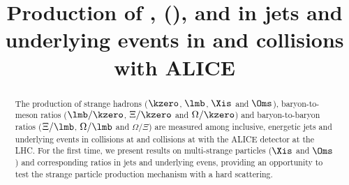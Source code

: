 \documentclass[ALICE,manyauthors]{cernphprep}
\begin{document}
\begin{titlepage}

\title{Production of \kzero, \lmb (\almb), \Xis and \Oms in jets and underlying events in \pp and \pPb collisions with ALICE}


\begin{abstract}
\label{sec:Abs}

The production of strange hadrons ($\kzero$, $\lmb$, $\Xis$ and $\Oms$), baryon-to-meson ratios ($\lmb/\kzero$, $\Xi/\kzero$ and $\Omega/\kzero$) and baryon-to-baryon ratios ($\Xi/\lmb$, $\Omega/\lmb$ and $\Omega/\Xi$) are measured among inclusive, energetic jets and underlying events in \pp collisions at \thirteen and \pPb collisions at \fivenn with the ALICE detector at the LHC.
For the first time, we present results on multi-strange particles ($\Xis$ and $\Oms$) and corresponding ratios in jets and underlying evens, providing an opportunity to test the strange particle production mechanism with a hard scattering.

\end{abstract}
\end{titlepage}
\end{document}
